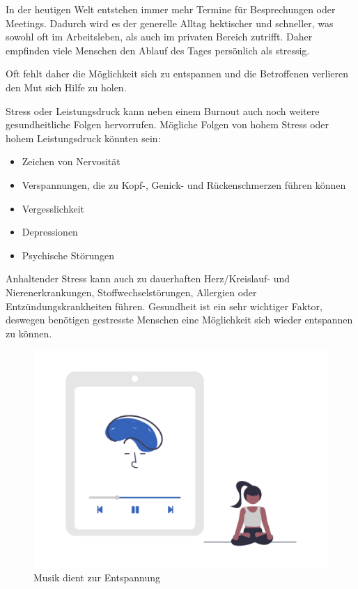 
In der heutigen Welt entstehen immer mehr Termine für Besprechungen oder Meetings. 
Dadurch wird es der generelle Alltag hektischer und schneller, was sowohl oft im Arbeitsleben, als auch im 
privaten Bereich zutrifft. Daher empfinden viele Menschen den Ablauf des Tages persönlich als stressig.

Oft fehlt daher die Möglichkeit sich zu entspannen und die Betroffenen verlieren den Mut sich
Hilfe zu holen.

Stress oder Leistungsdruck kann neben einem Burnout auch noch weitere gesundheitliche Folgen hervorrufen.
Mögliche Folgen von hohem Stress oder hohem Leistungsdruck könnten sein:

\begin{itemize}
    \item Zeichen von Nervosität
    \item Verspannungen, die zu Kopf-, Genick- und Rückenschmerzen führen können
    \item Vergesslichkeit
    \item Depressionen
    \item Psychische Störungen
\end{itemize}

Anhaltender Stress kann auch zu dauerhaften Herz/Kreislauf- und Nierenerkrankungen, Stoffwechselstörungen, 
Allergien oder Entzündungskrankheiten führen. \cite{stress} 
Gesundheit ist ein sehr wichtiger Faktor, deswegen benötigen gestresste Menschen eine Möglichkeit sich
wieder entspannen zu können.

\begin{figure}[H]
    \centering
    \includegraphics[height=0.35\textwidth]{./pics/undraw_Meditating_re_aiqa.png}
    \caption{Musik dient zur Entspannung}
\end{figure}

